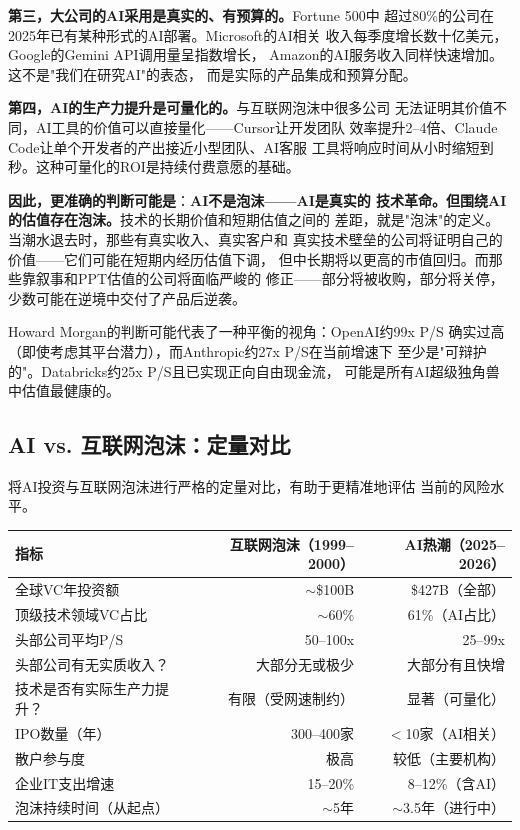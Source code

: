 \textbf{第三，大公司的AI采用是真实的、有预算的。}Fortune 500中
超过80\%的公司在2025年已有某种形式的AI部署。Microsoft的AI相关
收入每季度增长数十亿美元，Google的Gemini API调用量呈指数增长，
Amazon的AI服务收入同样快速增加。这不是"我们在研究AI"的表态，
而是实际的产品集成和预算分配。

\textbf{第四，AI的生产力提升是可量化的。}与互联网泡沫中很多公司
无法证明其价值不同，AI工具的价值可以直接量化——Cursor让开发团队
效率提升2--4倍、Claude Code让单个开发者的产出接近小型团队、AI客服
工具将响应时间从小时缩短到秒。这种可量化的ROI是持续付费意愿的基础。

\textbf{因此，更准确的判断可能是}：\textbf{AI不是泡沫——AI是真实的
技术革命。但围绕AI的估值存在泡沫。}技术的长期价值和短期估值之间的
差距，就是"泡沫"的定义。当潮水退去时，那些有真实收入、真实客户和
真实技术壁垒的公司将证明自己的价值——它们可能在短期内经历估值下调，
但中长期将以更高的市值回归。而那些靠叙事和PPT估值的公司将面临严峻的
修正——部分将被收购，部分将关停，少数可能在逆境中交付了产品后逆袭。

Howard Morgan的判断可能代表了一种平衡的视角：OpenAI约99x P/S
确实过高（即使考虑其平台潜力），而Anthropic约27x P/S在当前增速下
至少是"可辩护的"。Databricks约25x P/S且已实现正向自由现金流，
可能是所有AI超级独角兽中估值最健康的。

\subsection{AI vs. 互联网泡沫：定量对比}
\label{subsec:fund-dotcom-compare}

将AI投资与互联网泡沫进行严格的定量对比，有助于更精准地评估
当前的风险水平。

\begin{keybox}
\small
\begin{tabularx}{\textwidth}{X r r}
\toprule
\rowcolor{figLightGray}
\textbf{指标} & \textbf{互联网泡沫（1999--2000）}
  & \textbf{AI热潮（2025--2026）} \\
\midrule
全球VC年投资额         & $\sim$\$100B & \$427B（全部）\\
顶级技术领域VC占比      & $\sim$60\%  & 61\%（AI占比）\\
头部公司平均P/S         & 50--100x    & 25--99x \\
头部公司有无实质收入？    & 大部分无或极少 & 大部分有且快增 \\
技术是否有实际生产力提升？ & 有限（受网速制约） & 显著（可量化） \\
IPO数量（年）           & 300--400家  & $<$10家（AI相关）\\
散户参与度              & 极高         & 较低（主要机构）\\
企业IT支出增速          & 15--20\%    & 8--12\%（含AI） \\
泡沫持续时间（从起点）    & $\sim$5年   & $\sim$3.5年（进行中） \\
\bottomrule
\end{tabularx}
\end{keybox}

